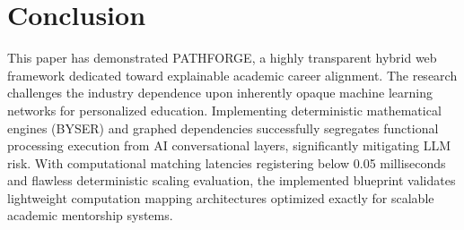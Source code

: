 \documentclass[conference]{IEEEtran}
\begin{document}
\section{Conclusion}

This paper has demonstrated PATHFORGE, a highly transparent hybrid web framework dedicated toward explainable academic career alignment. The research challenges the industry dependence upon inherently opaque machine learning networks for personalized education. Implementing deterministic mathematical engines (BYSER) and graphed dependencies successfully segregates functional processing execution from AI conversational layers, significantly mitigating LLM risk. With computational matching latencies registering below 0.05 milliseconds and flawless deterministic scaling evaluation, the implemented blueprint validates lightweight computation mapping architectures optimized exactly for scalable academic mentorship systems.



\end{document}

